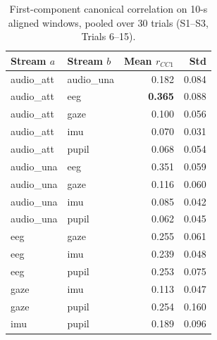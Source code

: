 \begin{table}[ht]
\centering
\begin{tabular}{llrr}
\toprule
Stream $a$ & Stream $b$ & Mean $r_{CC1}$ & Std \\
\midrule
audio\_att & audio\_una & 0.182 & 0.084 \\
audio\_att & eeg        & \textbf{0.365} & 0.088 \\
audio\_att & gaze       & 0.100 & 0.056 \\
audio\_att & imu        & 0.070 & 0.031 \\
audio\_att & pupil      & 0.068 & 0.054 \\
audio\_una & eeg        & 0.351 & 0.059 \\
audio\_una & gaze       & 0.116 & 0.060 \\
audio\_una & imu        & 0.085 & 0.042 \\
audio\_una & pupil      & 0.062 & 0.045 \\
eeg        & gaze       & 0.255 & 0.061 \\
eeg        & imu        & 0.239 & 0.048 \\
eeg        & pupil      & 0.253 & 0.075 \\
gaze       & imu        & 0.113 & 0.047 \\
gaze       & pupil      & 0.254 & 0.160 \\
imu        & pupil      & 0.189 & 0.096 \\
\bottomrule
\end{tabular}
\caption{First-component canonical correlation on 10-s aligned windows,
pooled over 30 trials (S1--S3, Trials 6--15).}
\end{table}

